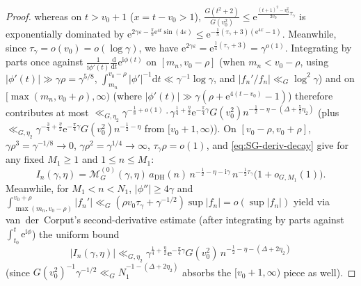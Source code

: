 \documentclass[11pt,a4paper,reqno]{amsart}
\theoremstyle{definition}
\theoremstyle{remark}
\numberwithin{equation}{section}
\newcommand{\dd}{\mathrm{d}}
\newcommand{\ii}{\mathrm{i}}
\newcommand{\ee}{\mathrm{e}}
\begin{document}
\begin{proof}
whereas on $t > v_0 + 1$ ($x = t - v_0 > 1$), $\frac{G(t^2+2)}{G(v_0^2)} \le \ee^{\frac{(t+1)^2 - v_0^2}{2v_0}\tau_\gamma}$ is exponentially dominated by $\ee^{2\gamma\varepsilon - \frac{\pi}{5}\ee^{4t}\sin(4\varepsilon)} \le \ee^{-\frac{1}{5}(\tau_\gamma + 3)(\ee^{4x} - 1)}$. Meanwhile, since $\tau_\gamma = o(v_0) = o(\log\gamma)$, we have $\ee^{2\gamma\varepsilon} = \ee^{\frac{1}{4}(\tau_\gamma + 3)} = \gamma^{o(1)}$. Integrating by parts once against $\frac{1}{\ii\phi'(t)}\frac{\dd}{\dd t}\ee^{\ii\phi(t)}$ on $[m_n, v_0 - \rho]$ (when $m_n < v_0 - \rho$, using $|\phi'(t)| \gg \gamma\rho = \gamma^{5/8}$, $\int_{m_n}^{v_0-\rho}|\phi'|^{-1}\dd t \ll \gamma^{-1}\log\gamma$, and $|f_n'/f_n| \ll_G \log^2\gamma$) and on $[\max(m_n, v_0+\rho), \infty)$ (where $|\phi'(t)| \gg \gamma(\rho + \ee^{4(t-v_0)} - 1)$) therefore contributes at most $\ll_{G,\eta_2} \gamma^{-\frac{1}{8} + o(1)}\cdot \gamma^{\frac{1}{4}+\frac{\eta}{2}}\ee^{-\frac{\pi}{4}\gamma} G(v_0^2) n^{-\frac{1}{2}-\eta - (\Delta + \frac{5}{2}\eta_2)}$ (plus $\ll_{G,\eta_2} \gamma^{-\frac{3}{4} + \frac{\eta}{2}}\ee^{-\frac{\pi}{4}\gamma} G(v_0^2) n^{-\frac{1}{2}-\eta}$ from $[v_0 + 1, \infty)$). On $[v_0 - \rho, v_0 + \rho]$, $\gamma\rho^3 = \gamma^{-1/8} \to 0$, $\gamma\rho^2 = \gamma^{1/4} \to \infty$, $\tau_\gamma\rho = o(1)$, and \eqref{eq:SG-deriv-decay} give for any fixed $M_1 \ge 1$ and $1 \le n \le M_1$:
\begin{equation*}
  I_n(\gamma, \eta)
  = \mathcal{M}_G^{(0)}(\gamma, \eta)\,a_{\mathrm{DH}}(n)\,n^{-\frac{1}{2}-\eta-\ii\gamma}\,n^{-\frac{1}{2}\tau_\gamma}\bigl(1 + o_{G,M_1}(1)\bigr).
\end{equation*}
Meanwhile, for $M_1 < n < N_1$, $|\phi''| \ge 4\gamma$ and $\int_{\max(m_n, v_0-\rho)}^{v_0+\rho}|f_n'| \ll_G (\rho v_0\tau_\gamma + \gamma^{-1/2})\sup|f_n| = o(\sup|f_n|)$ yield via van~der~Corput's second-derivative estimate \cite[Lem.~4.4]{titchmarsh1986} (after integrating by parts against $\int_{t_0}^t \ee^{\ii\phi}$) the uniform bound
\begin{equation*}
  |I_n(\gamma, \eta)|
  \ll_{G,\eta_2} \gamma^{\frac{1}{4}+\frac{\eta}{2}}\ee^{-\frac{\pi}{4}\gamma}G(v_0^2)\,n^{-\frac{1}{2}-\eta - (\Delta + 2\eta_2)}
\end{equation*}
(since $G(v_0^2)^{-1}\gamma^{-1/2} \ll_G N_1^{-1-(\Delta + 2\eta_2)}$ absorbs the $[v_0+1,\infty)$ piece as well).


\end{proof}
\end{document}
